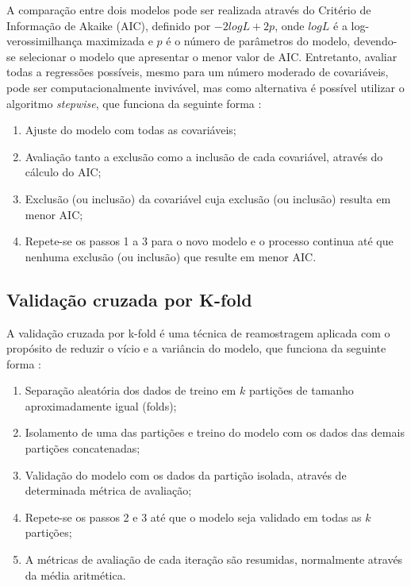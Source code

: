 \documentclass[twocolumn]{rbef}
\newcommand{\1}{\mathbbm{1}}
\begin{document}
A comparação entre dois modelos pode ser realizada através do Critério de Informação de Akaike (AIC), definido por \(-2logL + 2p\), onde \(logL\) é a log-verossimilhança maximizada e \(p\) é o número de parâmetros do modelo, devendo-se selecionar o modelo que apresentar o menor valor de AIC. Entretanto, avaliar todas a regressões possíveis, mesmo para um número moderado de covariáveis, pode ser computacionalmente invivável, mas como alternativa é possível utilizar o algoritmo \textit{stepwise}, que funciona da seguinte forma \cite{Taconeli2019}:

\begin{enumerate}
\def\labelenumi{\arabic{enumi}.}
\item
  Ajuste do modelo com todas as covariáveis;
\item
  Avaliação tanto a exclusão como a inclusão de cada covariável, através do cálculo do AIC;
\item
  Exclusão (ou inclusão) da covariável cuja exclusão (ou inclusão) resulta em menor AIC;
\item
  Repete-se os passos 1 a 3 para o novo modelo e o processo continua até que nenhuma exclusão (ou inclusão) que resulte em menor AIC.
\end{enumerate}

\hypertarget{validauxe7uxe3o-cruzada-por-k-fold}{%
\subsection{Validação cruzada por K-fold}\label{validauxe7uxe3o-cruzada-por-k-fold}}

A validação cruzada por k-fold é uma técnica de reamostragem aplicada com o propósito de reduzir o vício e a variância do modelo, que funciona da seguinte forma \cite{Kohavi1995}:

\begin{enumerate}
\def\labelenumi{\arabic{enumi}.}
\item
  Separação aleatória dos dados de treino em \(k\) partições de tamanho aproximadamente igual (folds);
\item
  Isolamento de uma das partições e treino do modelo com os dados das demais partições concatenadas;
\item
  Validação do modelo com os dados da partição isolada, através de determinada métrica de avaliação;
\item
  Repete-se os passos 2 e 3 até que o modelo seja validado em todas as \(k\) partições;
\item
  A métricas de avaliação de cada iteração são resumidas, normalmente através da média aritmética.
\end{enumerate}
\end{document}
